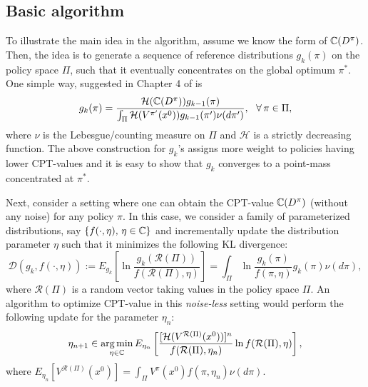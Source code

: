 \documentclass[11pt,letterpaper,english]{article}
\begin{document}
\subsection{Basic algorithm}
To illustrate the main idea in the algorithm, assume we know the form of $\mathbb{C}(D^\pi)$. Then, the idea is to generate a sequence of reference distributions $g_k(\pi)$ on the policy space $\Pi$, such that it eventually concentrates on the global optimum $\pi^*$. One simple way, suggested in Chapter 4 of \cite{chang2013simulation} is
\begin{equation}
\label{eqn:naive}
g_{k}(\pi)=
\frac{\mathcal{H}(\mathbb{C}(D^\pi))g_{k-1}(\pi)}
{\int_{\Pi}\mathcal{H}(V^{\pi'}(x^0))g_{k-1}(\pi')\nu(d\pi')},
~~\forall\, \pi \in \Pi,
\end{equation}
where $\nu$ is the Lebesgue/counting measure on $\Pi$ and $\mathcal{H}$ is a strictly decreasing function. The above construction for $g_k$'s assigns more weight to policies having lower CPT-values and it is easy to show that $g_k$ converges to a point-mass concentrated at $\pi^*$.

Next, consider a setting where one can obtain the CPT-value $\mathbb{C}(D^\pi)$ (without any noise) for any policy $\pi$. In this case, we consider a family of parameterized distributions, say $\{f(\cdot,\eta),\,\eta\in \mathbb{C} \}$ and incrementally update the distribution parameter $\eta$ such that it minimizes the following KL divergence:
\begin{equation}\label{eqn:kl}
\mathcal{D}(g_k,f(\cdot,\eta)):=E_{g_k}\left[\ln \frac{g_{k}(\mathcal{R}(\Pi))}{f(\mathcal{R}(\Pi),\eta)}\right]=\int_{\Pi} \ln \frac{g_{k}(\pi)}{f(\pi,\eta)}g_{k}(\pi)\nu(d\pi), \nonumber
\end{equation}
where $\mathcal{R}(\Pi)$ is a random vector taking values in the policy space $\Pi$. 
An algorithm to optimize CPT-value in this \textit{noise-less} setting would perform the following update for the parameter $\eta_n$:
\begin{equation}
\label{eqn:interior}
\eta_{n+1} \in \mathop{\rm arg\,min}_{\eta \in \mathbb{C}}
E_{\eta_n}\left[\frac{[\mathcal{H}(V^{\mathcal{R}(\Pi)}(x^0))]^{n}}
{f(\mathcal{R}(\Pi),\eta_{n})}
\ln f(\mathcal{R}(\Pi),\eta)\right],
\end{equation}
where $E_{\eta_n}[V^{\mathcal{R}(\Pi)}(x^0)]=\int_{\Pi} V^{\pi}(x^0)f(\pi,\eta_n)\nu(d\pi).$
\end{document}
